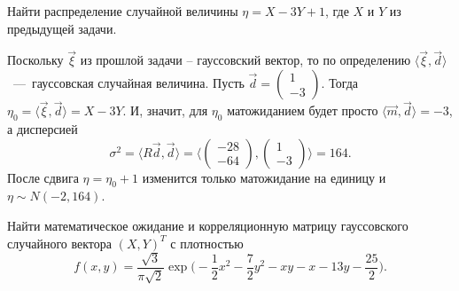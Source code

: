 \begin{problem}
    Найти распределение случайной величины $\eta = X - 3Y + 1$, где $X$ и $Y$ из предыдущей задачи.
\end{problem}
\begin{solution}
    Поскольку $\vec{\xi}$ из прошлой задачи -- гауссовский вектор, то по определению $\langle \vec{\xi}, \vec{d} \rangle$~---~гауссовская случайная величина.
    Пусть $\vec{d} = \begin{pmatrix*} 1 \\ -3
    \end{pmatrix*}.$
    Тогда $\eta_0 = \langle \vec{\xi}, \vec{d} \rangle = X - 3Y$.
    И, значит, для $\eta_0$ матожиданием будет просто $\langle \vec{m}, \vec{d} \rangle = -3$, а дисперсией \[\sigma^2 = \langle R\vec{d}, \vec{d} \rangle = \biggr\langle \begin{pmatrix*} -28 \\ -64
    \end{pmatrix*}, \begin{pmatrix*} 1 \\ -3
    \end{pmatrix*} \biggr\rangle = 164.\]
    После сдвига $\eta = \eta_0 + 1$ изменится только матожидание на единицу и $\eta \sim N(-2, 164)$.
\end{solution}
\begin{problem}
    Найти математическое ожидание и корреляционную матрицу гауссовского случайного вектора $(X, Y)^T$ с плотностью
    \[
        f(x, y) = \dfrac{\sqrt{3}}{\pi \sqrt {2}}\exp \biggr(-\dfrac{1}{2}x^2 - \dfrac{7}{2}y^2 - xy - x - 13y - \dfrac{25}{2}\biggr).
    \]
\end{problem}
